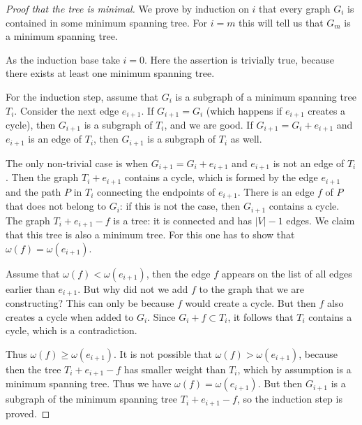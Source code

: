 \begin{proof}[Proof that the tree is minimal]
We prove by induction on $i$ that every graph $G_i$ is contained in some minimum spanning tree.
For $i=m$ this will tell us that $G_m$ is a minimum spanning tree.

As the induction base take $i=0$.
Here the assertion is trivially true, because there exists at least one minimum spanning tree.

For the induction step, assume that $G_i$ is a subgraph of a minimum spanning tree $T_i$.
Consider the next edge $e_{i+1}$.
If $G_{i+1} = G_i$ (which happens if $e_{i+1}$ creates a cycle), then $G_{i+1}$ is a subgraph of $T_i$, and we are good.
If $G_{i+1} = G_i + e_{i+1}$ and $e_{i+1}$ is an edge of $T_i$, then $G_{i+1}$ is a subgraph of $T_i$ as well.

The only non-trivial case is when $G_{i+1} = G_i + e_{i+1}$ and $e_{i+1}$ is not an edge of $T_i$.
Then the graph $T_i + e_{i+1}$ contains a cycle,
which is formed by the edge $e_{i+1}$ and the path $P$ in $T_i$ connecting the endpoints of $e_{i+1}$.
There is an edge $f$ of $P$ that does not belong to $G_i$: if this is not the case, then $G_{i+1}$ contains a cycle.
The graph $T_i + e_{i+1} - f$ is a tree: it is connected and has $|V|-1$ edges.
We claim that this tree is also a minimum tree.
For this one has to show that $\omega(f) = \omega(e_{i+1})$.

Assume that $\omega(f) < \omega(e_{i+1})$, then the edge $f$ appears on the list of all edges earlier than $e_{i+1}$.
But why did not we add $f$ to the graph that we are constructing?
This can only be because $f$ would create a cycle.
But then $f$ also creates a cycle when added to $G_i$.
Since $G_i + f \subset T_i$, it follows that $T_i$ contains a cycle, which is a contradiction.

Thus $\omega(f) \ge \omega(e_{i+1})$.
It is not possible that $\omega(f) > \omega(e_{i+1})$, because then the tree $T_i + e_{i+1} - f$ has smaller weight than $T_i$,
which by assumption is a minimum spanning tree.
Thus we have $\omega(f) = \omega(e_{i+1})$.
But then $G_{i+1}$ is a subgraph of the minimum spanning tree $T_i + e_{i+1} - f$, so the induction step is proved.
\end{proof}

